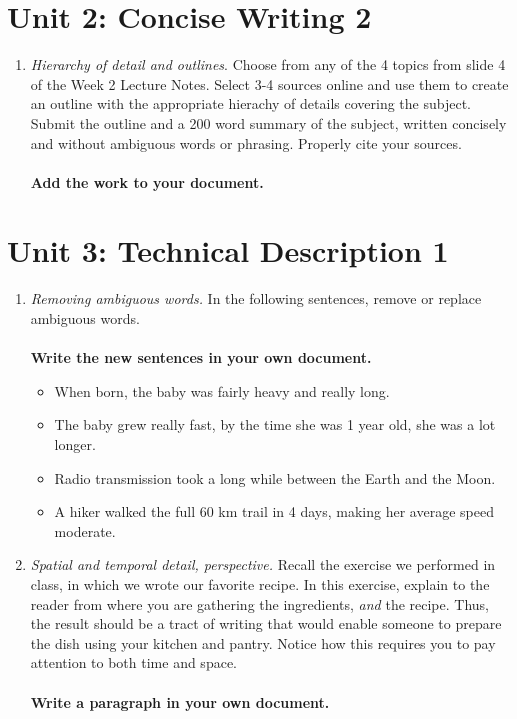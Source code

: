 \documentclass{article}
\begin{document}
\section{Unit 2: Concise Writing 2}

\begin{enumerate}
\item \textit{Hierarchy of detail and outlines}.  Choose from any of the 4 topics from slide 4 of the Week 2 Lecture Notes.  Select 3-4 sources online and use them to create an outline with the appropriate hierachy of details covering the subject.  Submit the outline and a 200 word summary of the subject, written concisely and without ambiguous words or phrasing. Properly cite your sources. \\ \\
\textbf{Add the work to your document.}
\end{enumerate}

\section{Unit 3: Technical Description 1}

\begin{enumerate}
\item \textit{Removing ambiguous words.}  In the following sentences, remove or replace ambiguous words. \\ \\
\textbf{Write the new sentences in your own document.} 
\begin{itemize}
\item When born, the baby was fairly heavy and really long.
\item The baby grew really fast, by the time she was 1 year old, she was a lot longer.
\item Radio transmission took a long while between the Earth and the Moon.
\item A hiker walked the full 60 km trail in 4 days, making her average speed moderate.
\end{itemize}
\item \textit{Spatial and temporal detail, perspective.}  Recall the exercise we performed in class, in which we wrote our favorite recipe.  In this exercise, explain to the reader from where you are gathering the ingredients, \textit{and} the recipe.  Thus, the result should be a tract of writing that would enable someone to prepare the dish using your kitchen and pantry. Notice how this requires you to pay attention to both time and space. \\ \\
\textbf{Write a paragraph in your own document.} 
\end{enumerate}
\end{document}
